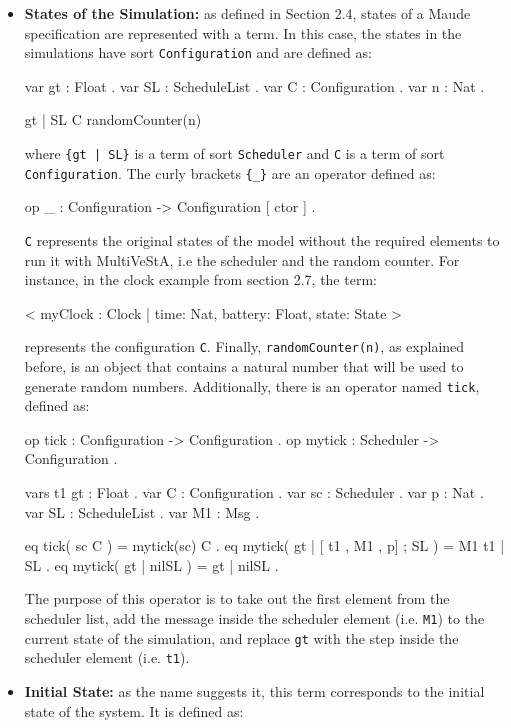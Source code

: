 \begin{itemize}
    \item \textbf{States of the Simulation:} as defined in Section 2.4, states of a Maude specification are represented with a term. In this case, the states in the simulations have sort \texttt{Configuration} and are defined as:
    \begin{maude}

var gt : Float .
var SL : ScheduleList .
var C : Configuration .
var n : Nat .

{gt | SL} {C randomCounter(n)} \end{maude}
    where \texttt{\{gt | SL\}} is a term of sort \texttt{Scheduler} and \texttt{C} is a term of sort \texttt{Configuration}. The curly brackets \texttt{\{\_\}} are an operator defined as: 
    \begin{maude}
    
op { _ } : Configuration -> Configuration [ ctor ] . \end{maude}
    \texttt{C} represents the original states of the model without the required elements to run it with MultiVeStA, i.e the scheduler and the random counter. For instance, in the clock example from section 2.7, the term: 
    \begin{maude}
    
< myClock : Clock | time: Nat, battery: Float, state: State > \end{maude}
    represents the configuration \texttt{C}. Finally, \texttt{randomCounter(n)}, as explained before, is an object that contains a natural number that will be used to generate random numbers. Additionally, there is an operator named \texttt{tick}, defined as:
    \begin{maude}

op tick : Configuration -> Configuration .
op mytick : Scheduler -> Configuration .

vars t1 gt : Float .
var C : Configuration .
var sc : Scheduler .
var p : Nat .
var SL : ScheduleList .
var M1 : Msg .

eq tick( sc C ) = mytick(sc) C .
eq mytick({ gt | [ t1 , M1 , p] ; SL }) = M1 { t1 | SL } .
eq mytick({ gt | nilSL }) = { gt | nilSL } . \end{maude}
    The purpose of this operator is to take out the first element from the scheduler list, add the message inside the scheduler element (i.e. \texttt{M1}) to the current state of the simulation, and replace \texttt{gt} with the step inside the scheduler element (i.e. \texttt{t1}).  
 
    \item\textbf{Initial State:} as the name suggests it, this term corresponds to the initial state of the system. It is defined as:
    \begin{maude}


\end{maude}
\end{itemize}
